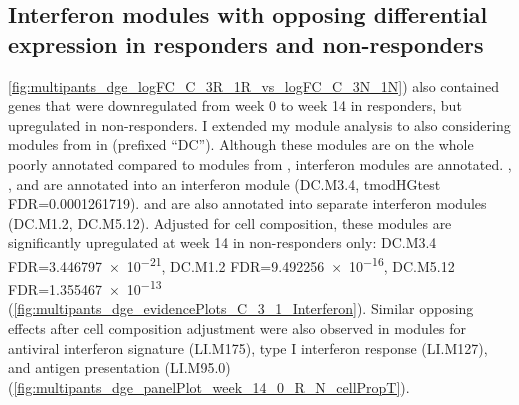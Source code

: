 \begin{outline}
\subsection{Interferon modules with opposing differential expression in responders and non-responders}
\label{subsec:multipants_dge_opposing_interferon}

\autoref{fig:multipants_dge_logFC_C_3R_1R_vs_logFC_C_3N_1N}) also contained genes that were downregulated from week 0 to week 14 in responders, but upregulated in non-responders.
I extended my module analysis to also considering modules from \autocite{chaussabel2008ModularAnalysisFramework} in  (prefixed \enquote{DC}).
Although these modules are on the whole poorly annotated compared to modules from \autocite{li2013MolecularSignaturesAntibody}, interferon modules are annotated.
, , and  are annotated into an interferon module (DC.M3.4, tmodHGtest FDR=\num{0.0001261719}).
 and  are also annotated into separate interferon modules (DC.M1.2, DC.M5.12).
Adjusted for cell composition, these modules are significantly upregulated at week 14 in non-responders only: 
DC.M3.4
FDR=\num{3.446797e-21},
DC.M1.2
FDR=\num{9.492256e-16},
DC.M5.12
FDR=\num{1.355467e-13}
(\autoref{fig:multipants_dge_evidencePlots_C_3_1_Interferon}).
Similar opposing effects after cell composition adjustment were also observed in \autocite{li2013MolecularSignaturesAntibody} modules for
antiviral interferon signature (LI.M175), type I interferon response (LI.M127), and antigen presentation (LI.M95.0) (\autoref{fig:multipants_dge_panelPlot_week_14_0_R_N_cellPropT}).


\end{outline}
